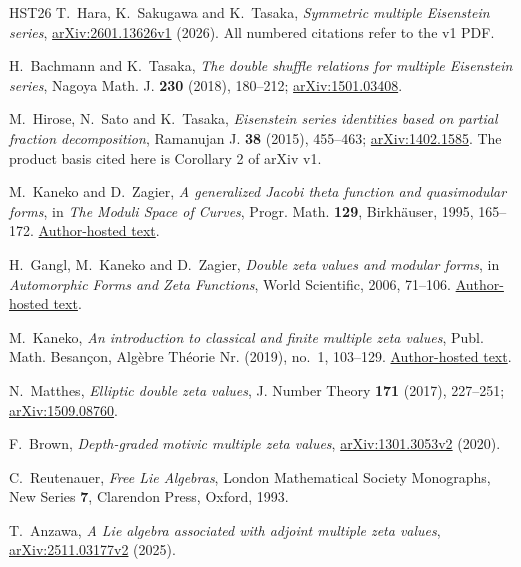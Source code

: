 \documentclass[12pt]{amsart}
\theoremstyle{definition}
\theoremstyle{remark}
\numberwithin{equation}{section}
\numberwithin{equation}{section}
\begin{document}
\begin{thebibliography}{HST26}
T.~Hara, K.~Sakugawa and K.~Tasaka,
\emph{Symmetric multiple Eisenstein series},
\href{https://arxiv.org/abs/2601.13626}{arXiv:2601.13626v1} (2026).
All numbered citations refer to the v1 PDF.

H.~Bachmann and K.~Tasaka,
\emph{The double shuffle relations for multiple Eisenstein series},
Nagoya Math. J. \textbf{230} (2018), 180--212;
\href{https://arxiv.org/abs/1501.03408}{arXiv:1501.03408}.

M.~Hirose, N.~Sato and K.~Tasaka,
\emph{Eisenstein series identities based on partial fraction decomposition},
Ramanujan J. \textbf{38} (2015), 455--463;
\href{https://arxiv.org/abs/1402.1585}{arXiv:1402.1585}.
The product basis cited here is Corollary 2 of arXiv v1.

M.~Kaneko and D.~Zagier,
\emph{A generalized Jacobi theta function and quasimodular forms},
in \emph{The Moduli Space of Curves}, Progr. Math. \textbf{129},
Birkh\"auser, 1995, 165--172.
\href{https://www2.math.kyushu-u.ac.jp/~mkaneko/papers/12quasimodular.pdf}{Author-hosted text}.

H.~Gangl, M.~Kaneko and D.~Zagier,
\emph{Double zeta values and modular forms},
in \emph{Automorphic Forms and Zeta Functions}, World Scientific, 2006, 71--106.
\href{https://www2.math.kyushu-u.ac.jp/~mkaneko/papers/35Double_zeta_values.pdf}{Author-hosted text}.

M.~Kaneko, \emph{An introduction to classical and finite multiple zeta values},
Publ. Math. Besan\c{c}on, Alg\`ebre Th\'eorie Nr. (2019), no.~1, 103--129.
\href{https://www2.math.kyushu-u.ac.jp/~mkaneko/papers/Lyon_Proc_rev.pdf}{Author-hosted text}.

N.~Matthes, \emph{Elliptic double zeta values},
J. Number Theory \textbf{171} (2017), 227--251;
\href{https://arxiv.org/abs/1509.08760}{arXiv:1509.08760}.

F.~Brown, \emph{Depth-graded motivic multiple zeta values},
\href{https://arxiv.org/abs/1301.3053}{arXiv:1301.3053v2} (2020).

C.~Reutenauer, \emph{Free Lie Algebras},
London Mathematical Society Monographs, New Series \textbf{7},
Clarendon Press, Oxford, 1993.

T.~Anzawa, \emph{A Lie algebra associated with adjoint multiple zeta values},
\href{https://arxiv.org/abs/2511.03177}{arXiv:2511.03177v2} (2025).


\end{thebibliography}
\end{document}
